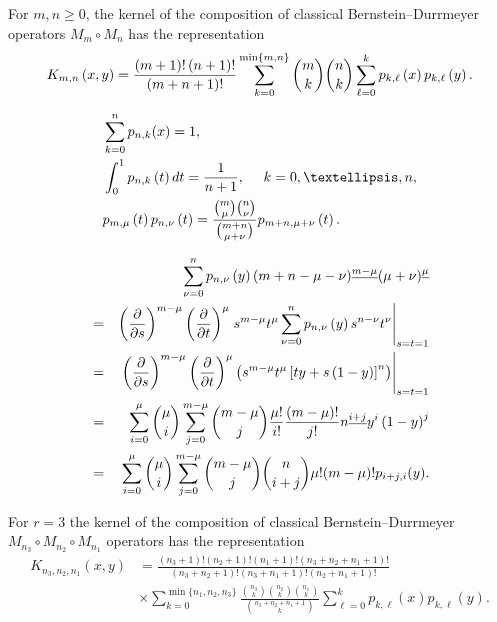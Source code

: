 \documentclass[10pt,a4paper]{amsart}
\begin{document}
\begin{theorem}
\label{P1} \label{corollary-kernel-K_m,n[-1]}For $m,n\geq 0$, the kernel of
the composition of classical Bernstein--Durrmeyer operators $M_{m}\circ
M_{n} $ has the representation 
\begin{equation*}
K_{m,n}\left( x,y\right) =\frac{\left( m+1\right) !\left( n+1\right) !}{%
\left( m+n+1\right) !}\sum_{k=0}^{\min \{m,n\}}\binom{m}{k}\binom{n}{k}%
\sum_{\ell =0}^{k}p_{k,\ell }\left( x\right) p_{k,\ell }\left( y\right) .
\end{equation*}
\end{theorem}

\begin{align}
& \displaystyle \sum_{k=0}^{n}p_{n,k}(x)=1,  \label{eq.w1} \\
& \int_{0}^{1}p_{n,k}\left( t\right) dt=\frac{1}{n+1}, \text{ \quad } k=0,\ldots,n ,  \label{eq.w2} \\
& p_{m,\mu }\left( t\right) p_{n,\nu }\left( t\right) =\frac{\binom{m}{\mu }%
\binom{n}{\nu }}{\binom{m+n}{\mu +\nu }}p_{m+n,\mu +\nu }\left( t\right) .
\label{eq.w3}
\end{align}

\begin{eqnarray}
&&\sum_{\nu =0}^{n}p_{n,\nu }\left( y\right) (m+n-\mu -\nu )^{\underline{%
m-\mu }}(\mu +\nu )^{\underline{\mu }}  \label{eq.ww1} \\
&=&\left( \frac{\partial }{\partial s}\right) ^{m-\mu }\left( \frac{\partial 
}{\partial t}\right) ^{\mu }\left. s^{m-\mu }t^{\mu }\sum_{\nu
=0}^{n}p_{n,\nu }\left( y\right) s^{n-\nu }t^{\nu }\right \vert _{s=t=1} 
\notag \\
&=&\left. \left( \frac{\partial }{\partial s}\right) ^{m-\mu }\left( \frac{%
\partial }{\partial t}\right) ^{\mu }\left( s^{m-\mu }t^{\mu }\left[
ty+s\left( 1-y\right) \right] ^{n}\right) \right \vert _{s=t=1}  \notag \\
&=&\sum_{i=0}^{\mu }\binom{\mu }{i}\sum_{j=0}^{m-\mu }\binom{m-\mu }{j}\frac{%
\mu !}{i!}\frac{\left( m-\mu \right) !}{j!}
n^{\underline{i+j}}   %
y^{i}\left( 1-y\right) ^{j}  \notag \\
&=&\displaystyle \sum_{i=0}^{\mu }{\binom{\mu }{i}}\sum_{j=0}^{m-\mu }{%
\binom{m-\mu }{j}}{\binom{n}{i+j}}\mu !(m-\mu )!p_{i+j,i}(y).  \notag
\end{eqnarray}%

\begin{theorem}
For $r=3$ the kernel of the composition of classical Bernstein--Durrmeyer $%
M_{n_3}\circ M_{n_2}\circ M_{n_1}$ operators has the representation 
\begin{align*}
K_{n_3,n_2,n_1} \left( x,y\right) &=\frac{\left( n_3+1\right) !\left(
n_2+1\right) !\left( n_1+1\right) !\left( n_3+n_2+n_1+1\right) !}{\left(
n_3+n_2+1\right) !\left( n_3+n_1+1\right) !\left( n_2+n_1+1\right) !} \\
&\times \sum_{k= 0}^{\min \{n_1,n_2,n_3\}}\frac{\binom{n_3}{k}\binom{n_2}{k}%
\binom{n_1}{k}}{\binom{n_3+n_2+n_1+1}{k}}\sum_{\ell =0}^{k}p_{k,\ell }\left(
x\right) p_{k,\ell }\left( y\right).
\end{align*}
\end{theorem}
\end{document}
